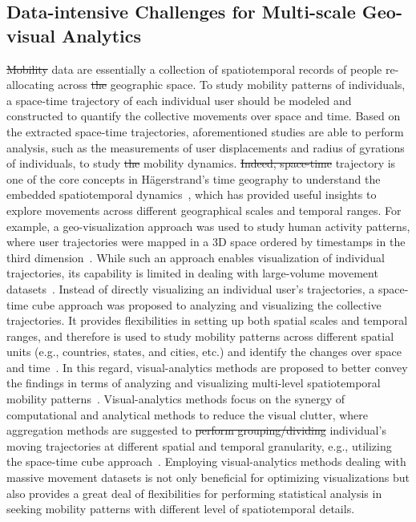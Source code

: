 \documentclass[ijgi,article,accept,moreauthors,pdftex,10pt,a4paper]{mdpi}
\theoremstyle{mdpi}
\newcounter{ex}
\newcounter{re}
\theoremstyle{mdpidefinition}
\providecommand{\DIFadd}[1]{{\protect\color{blue}\uwave{#1}}} %
\providecommand{\DIFdel}[1]{{\protect\color{red}\sout{#1}}}                      %
\providecommand{\DIFaddbegin}{} %
\providecommand{\DIFaddend}{} %
\providecommand{\DIFdelbegin}{} %
\providecommand{\DIFdelend}{} %
\begin{document}
\subsection{Data-intensive Challenges for Multi-scale Geo-visual Analytics}
\DIFdelbegin \DIFdel{Mobility }\DIFdelend \DIFaddbegin \DIFadd{Human mobility }\DIFaddend data are essentially a collection of spatiotemporal records of people re-allocating across \DIFdelbegin \DIFdel{the }\DIFdelend geographic space.
To study mobility patterns of individuals, a space-time trajectory of each individual user should be modeled and constructed to quantify the collective movements over space and time.
Based on the extracted space-time trajectories, aforementioned studies are able to perform analysis, such as the measurements of user displacements and radius of gyrations of individuals, to study \DIFdelbegin \DIFdel{the }\DIFdelend mobility dynamics.
\DIFdelbegin \DIFdel{Indeed, space-time }\DIFdelend \DIFaddbegin \DIFadd{Space-time }\DIFaddend trajectory is one of the core concepts in H{\"a}gerstrand's time geography to understand the embedded spatiotemporal dynamics~\cite{hagerstrand1985time}, which has provided useful insights to explore movements across different geographical scales and temporal ranges.
For example, a geo-visualization approach was used to study human activity patterns, where user trajectories were mapped in a 3D space ordered by timestamps in the third dimension~\cite{kwan2004geovisualization}.
While such an approach enables visualization of individual trajectories, its capability is limited in dealing with large-volume movement datasets~\cite{andrienko2007designing}.
Instead of directly visualizing an individual user's trajectories, a space-time cube approach was proposed to analyzing and visualizing the collective trajectories.
It provides flexibilities in setting up both spatial scales and temporal ranges, and therefore is used to study mobility patterns across different spatial units (e.g., countries, states, and cities, etc.) and identify the changes over space and time~\cite{maceachren2001research, maceachren2004maps}.
In this regard, visual-analytics methods are proposed to better convey the findings in terms of analyzing and visualizing multi-level spatiotemporal mobility patterns~\cite{andrienko2007designing,andrienko2007visual}.
Visual-analytics methods focus on the synergy of computational and analytical methods to reduce the visual clutter, where aggregation methods are suggested to \DIFdelbegin \DIFdel{perform grouping/dividing }\DIFdelend \DIFaddbegin \DIFadd{group and divide }\DIFaddend individual's moving trajectories at different spatial and temporal granularity, e.g., utilizing the space-time cube approach~\cite{andrienko2007designing}.
Employing visual-analytics methods dealing with massive movement datasets is not only beneficial for optimizing visualizations but also provides a great deal of flexibilities for performing statistical analysis in seeking mobility patterns with different level of spatiotemporal details. 
\end{document}
